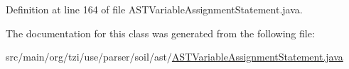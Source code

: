 Definition at line 164 of file A\-S\-T\-Variable\-Assignment\-Statement.\-java.



The documentation for this class was generated from the following file\-:\begin{DoxyCompactItemize}
\item 
src/main/org/tzi/use/parser/soil/ast/\hyperlink{_a_s_t_variable_assignment_statement_8java}{A\-S\-T\-Variable\-Assignment\-Statement.\-java}\end{DoxyCompactItemize}
